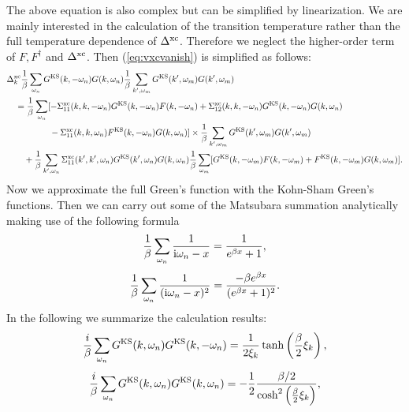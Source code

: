%
The above equation is also complex but can be simplified by linearization.
We are mainly interested in the calculation of the transition temperature rather than the full temperature 
dependence of $\Delta^{\rm xc}$. Therefore we neglect the higher-order term of $F, F^{\dag}$ and $\Delta^{\rm xc}$.
Then (\ref{eq:vxcvanish}) is simplified as follows:
%
\begin{equation}
	\begin{split}
		&\Delta^{\rm xc}_{k}\frac{1}{\beta}\sum_{\omega_n}G^{\rm KS}(k,-\omega_n)G(k,\omega_n)
		\frac{1}{\beta}\sum_{k',\omega_m}G^{\rm KS}(k',\omega_m)G(k',\omega_m) \\
		& \quad =
		\frac{1}{\beta}\sum_{\omega_n} [-\Sigma^{\rm xc}_{11}(k,k,-\omega_n)G^{\rm KS}(k,-\omega_n)F(k,-\omega_n)
		+\Sigma^{\rm xc}_{12}(k,k,-\omega_n)G^{\rm KS}(k,-\omega_n)G(k,\omega_n) \\
		&\quad \quad \quad \quad \quad - \Sigma^{\rm xc}_{11}(k,k,\omega_n)F^{\rm KS}(k,-\omega_n)G(k,\omega_n)]
		\times \frac{1}{\beta}\sum_{k',\omega_m} G^{\rm KS}(k',\omega_m)G(k', \omega_m) \\
		& \quad \quad +
		\frac{1}{\beta}\sum_{k',\omega_n}\Sigma^{\rm xc}_{11}(k',k',\omega_n)G^{\rm KS}(k',\omega_n)
		G(k,\omega_n)\frac{1}{\beta}\sum_{\omega_m}
		[G^{\rm KS}(k,-\omega_m)F(k,-\omega_m) + F^{\rm KS}(k,-\omega_m)G(k,\omega_m)].
	\end{split}
	\label{eq:Deltaxceq}
\end{equation}
%
Now we approximate the full Green's function with the Kohn-Sham Green's functions.
Then we can carry out some of the Matsubara summation analytically making use of the following formula
%
\begin{equation}
	\frac{1}{\beta} \sum_{\omega_n} \frac{1}{ {\rm i}\omega_n - x} = 
	\frac{1}{e^{\beta x}+1},
	\label{eq:sumform1}
\end{equation}
%
\begin{equation}
	\frac{1}{\beta} \sum_{\omega_n} \frac{1}{ ({\rm i}\omega_n - x)^2} = 
	\frac{-\beta e^{\beta x}}{(e^{\beta x}+1)^2}.
	\label{eq:sumform2}
\end{equation}
%
In the following we summarize the calculation results: 
%
\begin{equation}
	\frac{i}{\beta}\sum_{\omega_n}
	G^{\rm KS}(k,\omega_n)G^{\rm KS}(k,-\omega_n) 
	= \frac{1}{2\xi_{k}}\tanh\left( \frac{\beta}{2}\xi_{k} \right),
	\label{eq:GGsum1}
\end{equation}
%
\begin{equation}
	\frac{i}{\beta}\sum_{\omega_n}
	G^{\rm KS}(k,\omega_n)G^{\rm KS}(k,\omega_n) 
	= - \frac{1}{2} \frac{\beta/2}{\cosh^2\left( \frac{\beta}{2}\xi_{k} \right)},
	\label{eq:GGsum2}
\end{equation}
